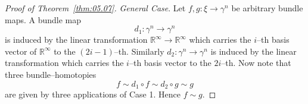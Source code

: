\documentclass[../main]{subfiles}
\begin{document}
\begin{proof}[Proof of Theorem~\ref{thm:05.07}]
\emph{General Case}. Let $f, g : \xi \longrightarrow \gamma^n$ be arbitrary bundle maps. A bundle map \[d_1 : \gamma^n \longrightarrow \gamma^n\] is induced by the linear transformation ${\mathbb R}^\infty \longrightarrow {\mathbb R}^\infty$ which carries the $i$--th basis vector of ${\mathbb R}^\infty$ to the $(2 i - 1)$--th. Similarly $d_2 : \gamma^n \longrightarrow \gamma^n$ is induced by the linear transformation which carries the $i$--th basis vector to the $2i$--th. Now note that three bundle--homotopies \[f \sim d_1 \circ f \sim d_2 \circ g \sim g\] are given by three applications of Case 1. Hence $f \sim g$.
\end{proof}
\end{document}
